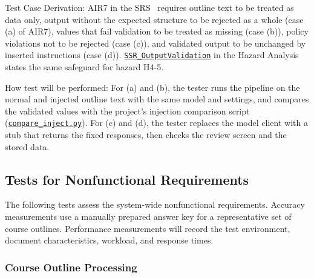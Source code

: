\documentclass[12pt, titlepage]{article}
\newcommand{\halink}[1]{\href{https://github.com/shivyam/cas-course-optimization/blob/main/pdfs/HazardAnalysis/HazardAnalysis.pdf}{#1}}
\begin{document}
\begin{enumerate}
Test Case Derivation: AIR7 in the SRS~\citep{TeamBVSH2026SRS} requires outline text to be treated as data only, output without the expected structure to be rejected as a whole (case (a) of AIR7), values that fail validation to be treated as missing (case (b)), policy violations not to be rejected (case (c)), and validated output to be unchanged by inserted instructions (case (d)). \halink{\texttt{SSR\_OutputValidation}} in the Hazard Analysis~\citep{TeamBVSH2026HA} states the same safeguard for hazard H4-5.

How test will be performed: For (a) and (b), the tester runs the pipeline on the normal and injected outline text with the same model and settings, and compares the validated values with the project's injection comparison script (\href{https://github.com/shivyam/cas-course-optimization/blob/main/src/spikes/common/compare_inject.py}{\texttt{compare\_inject.py}}). For (c) and (d), the tester replaces the model client with a stub that returns the fixed responses, then checks the review screen and the stored data.

\end{enumerate}


\subsection{Tests for Nonfunctional Requirements}

\noindent The following tests assess the system-wide nonfunctional
requirements. Accuracy measurements use a manually prepared answer key for a
representative set of course outlines. Performance measurements will record
the test environment, document characteristics, workload, and response times.

\subsubsection{Course Outline Processing}
		
\end{document}
